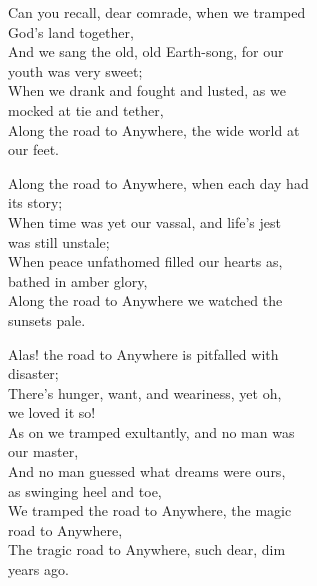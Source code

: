
\begin{poemblock}
Can you recall, dear comrade, when we tramped\\
\idt God's land together,\\
And we sang the old, old Earth-song, for our\\
\idt youth was very sweet;\\
When we drank and fought and lusted, as we\\
\idt mocked at tie and tether,\\
Along the road to Anywhere, the wide world at\\
\idt our feet.

Along the road to Anywhere, when each day had\\
\idt its story;\\
When time was yet our vassal, and life's jest\\
\idt was still unstale;\\
When peace unfathomed filled our hearts as,\\
\idt bathed in amber glory,\\
Along the road to Anywhere we watched the\\
\idt sunsets pale.

Alas! the road to Anywhere is pitfalled with\\
\idt disaster;\\
There's hunger, want, and weariness, yet oh,\\
\idt we loved it so!\\
As on we tramped exultantly, and no man was\\
\idt our master,\\
And no man guessed what dreams were ours,\\
\idt as swinging heel and toe,\\
We tramped the road to Anywhere, the magic\\
\idt road to Anywhere,\\
The tragic road to Anywhere, such dear, dim\\
\idt years ago.
\end{poemblock}
